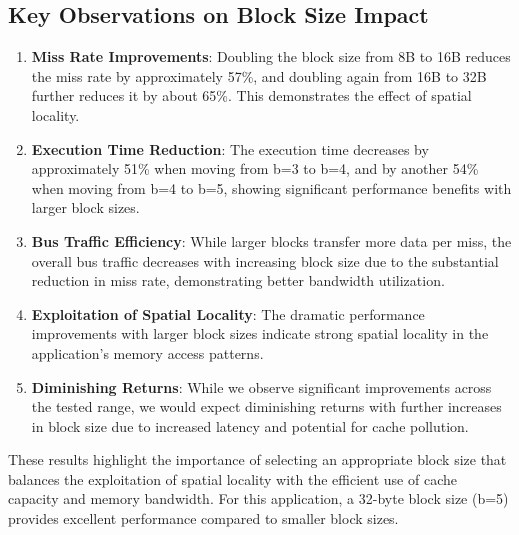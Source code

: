 \documentclass[12pt,a4paper]{article}
\begin{document}
\subsection{Key Observations on Block Size Impact}

\begin{enumerate}
    \item \textbf{Miss Rate Improvements}: Doubling the block size from 8B to 16B reduces the miss rate by approximately 57\%, and doubling again from 16B to 32B further reduces it by about 65\%. This demonstrates the effect of spatial locality.
    
    \item \textbf{Execution Time Reduction}: The execution time decreases by approximately 51\% when moving from b=3 to b=4, and by another 54\% when moving from b=4 to b=5, showing significant performance benefits with larger block sizes.
    
    \item \textbf{Bus Traffic Efficiency}: While larger blocks transfer more data per miss, the overall bus traffic decreases with increasing block size due to the substantial reduction in miss rate, demonstrating better bandwidth utilization.
    
    \item \textbf{Exploitation of Spatial Locality}: The dramatic performance improvements with larger block sizes indicate strong spatial locality in the application's memory access patterns.
    
    \item \textbf{Diminishing Returns}: While we observe significant improvements across the tested range, we would expect diminishing returns with further increases in block size due to increased latency and potential for cache pollution.
\end{enumerate}

These results highlight the importance of selecting an appropriate block size that balances the exploitation of spatial locality with the efficient use of cache capacity and memory bandwidth. For this application, a 32-byte block size (b=5) provides excellent performance compared to smaller block sizes.

\end{document}
